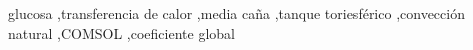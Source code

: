 \begin{frontmatter}
	\begin{keyword}
		glucosa \sep transferencia de calor \sep media ca\~na \sep tanque toriesf\'erico \sep convecci\'on natural \sep COMSOL \sep coeficiente global
	\end{keyword}

\end{frontmatter}

\pagestyle{corporativo}
\thispagestyle{corporativo}
